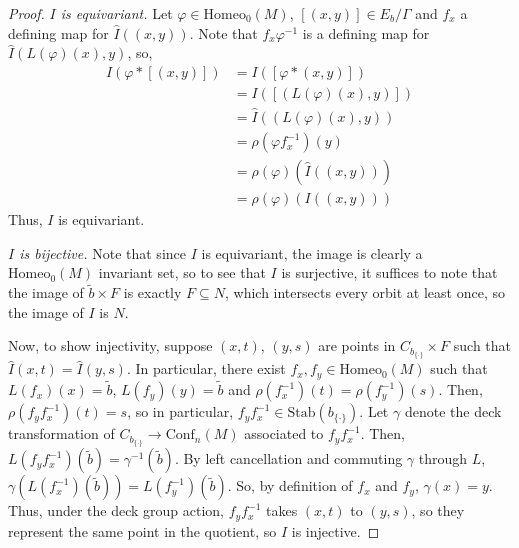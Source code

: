 \documentclass[10pt, oneside]{article}
\newcommand{\homeo}[1][S^1]{\text{Homeo}_0(#1)}
\newcommand{\conf}[2][S^1]{\text{Conf}_{#2}(#1)}
\newcommand{\set}{{\{\cdot\}}}
\newcommand{\stab}[1]{\text{Stab}(#1)}
\newcommand{\maxcov}{C_{b_\set}}
\theoremstyle{definition}
\theoremstyle{definition}
\begin{document}
\begin{proof}
    \medskip
    {\it $I$ is equivariant.}
    Let $\varphi\in\homeo[M]$, $[(x,y)]\in E_b/\Gamma$ and $f_x$ a defining map for $\hat{I}((x,y))$. Note that $f_x\varphi^{-1}$ is a defining map for $\hat{I}(L(\varphi)(x), y)$, so,
    \begin{align*}
        I(\varphi*[(x,y)]) &= I([\varphi*(x, y)]) \\
                        &= I([(L(\varphi)(x), y)]) \\
                        &= \hat{I}((L(\varphi)(x), y)) \\
                        &= \rho(\varphi f_x^{-1})(y) \\
                        &= \rho(\varphi)(\hat{I}((x,y))) \\
                        &= \rho(\varphi)(I((x, y)))
    \end{align*}
    Thus, $I$ is equivariant.
    
    \medskip
    {\it $I$ is bijective.} Note that since $I$ is equivariant, the image is clearly a $\homeo[M]$ invariant set, so to see that $I$ is surjective, it suffices to note that the image of ${\tilde{b}}\times F$ is exactly $F\subseteq N$, which intersects every orbit at least once, so the image of $I$ is $N$. 
    
    Now, to show injectivity, suppose $(x,t)$, $(y, s)$ are points in $\maxcov\times F$ such that $\hat{I}(x,t) = \hat{I}(y, s)$. In particular, there exist $f_x, f_y\in\homeo[M]$ such that $L(f_x)(x) = \tilde{b}$, $L(f_y)(y) = \tilde{b}$ and $\rho(f_x^{-1})(t) = \rho(f_y^{-1})(s)$. Then, $\rho(f_y f_x^{-1})(t)= s$, so in particular, $f_y f_x^{-1}\in\stab{b_{\set}}$. Let $\gamma$ denote the deck transformation of $\maxcov\to\conf[M]{n}$ associated to $f_y f_x^{-1}$. Then, $L(f_y f_x^{-1})(\tilde{b}) = \gamma^{-1}(\tilde{b})$. By left cancellation and commuting $\gamma$ through $L$, $\gamma(L(f_x^{-1})(\tilde{b})) = L(f_y^{-1})(\tilde{b})$. So, by definition of $f_x$ and $f_y$, $\gamma(x) = y$. Thus, under the deck group action, $f_y f_x^{-1}$ takes $(x, t)$ to $(y, s)$, so they represent the same point in the quotient, so $I$ is injective. 
    

\end{proof}
\end{document}
